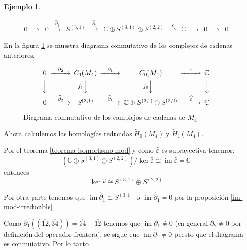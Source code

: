 \documentclass[12pt]{book}
\theoremstyle{definition}
\newtheorem{example}[theorem]{Ejemplo}
\DeclareMathOperator{\im}{im}
\newcounter{in}
\newcounter{ini}
\begin{document}
\begin{example}
\begin{small}
    \[
    \begin{array}{ccccccccccccc}
      \dots 0 & \rightarrow & 0 &
      \stackrel{\widehat\partial_{2}}{\rightarrow} &  S^{(3,1)} &
      \stackrel{\widehat\partial_{1}}{\rightarrow} & \mathbb{C} \oplus
      S^{(3,1)}\oplus S^{(2,2)} & \stackrel{\widehat\varepsilon}{\rightarrow} &
      \mathbb{C} & \rightarrow  & 0 & \rightarrow & 0 \dots
    \end{array} 
    \]
  \end{small}

En la figura \ref{fig:diagrama-conmutativo4} se muestra diagrama
conmutativo de los complejos de cadenas anteriores.
\begin{figure}[!hbtp]
  \centering
  \[
  \begin{CD}
    0 @>{\partial_{2}}>> C_{1}(M_{4}) @>{\partial_{1}}>> C_{0}(M_{4}) @>{\varepsilon}>> \mathbb{C}\\
    @VVV   @V{f_{1}}VV   @V{f_{0}}VV   @VVV    \\
    0 @>{\widehat\partial_{2}}>> S^{(3,1)} @>{\widehat\partial_{1}}>>
    \mathbb{C} \oplus S^{(3,1)}\oplus S^{(2,2)} @>{\widehat
      \varepsilon}>> \mathbb{C}
  \end{CD}
  \]
  
  \caption{Diagrama conmutativo de los complejos de cadenas de $M_{4}$}
\label{fig:diagrama-conmutativo4}
\end{figure}

Ahora calculemos las homologías reducidas $\widetilde H_{0}(M_{4})$ y
$\widetilde H_{1}(M_{4})$.

Por el teorema \ref{teorema-isomorfismo-mod} y como
$\widehat\varepsilon$ es suprayectiva tenemos:
$$(\mathbb{C} \oplus S^{(3,1)}\oplus S^{(2,2)})/\ker\widehat\varepsilon\cong\im\widehat\varepsilon=\mathbb{C}$$
entonces
\begin{equation}
\label{ker-0-4}
\ker\widehat\varepsilon\cong S^{(3,1)}\oplus S^{(2,2)}
\end{equation}

Por otra parte tenemos que $\im\widehat\partial_{1}\cong S^{(3,1)}$ o $\im\widehat\partial_{1}=0$ por
la proposición \ref{im-mod-irreducible}

Como $\partial_{1}((\overline{12},\overline{34}))=\overline{34}-\overline{12}$
tenemos que $\im\partial_{1}\neq 0$ (en general $\partial_{k}\neq 0$
por definición del operador frontera), se sigue que
$\im\widehat\partial_{1}\neq 0$ puesto que el diagrama es
conmutativo. Por lo tanto 


\end{example}
\end{document}
